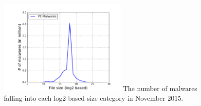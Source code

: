 \begin{figure}[t!]
\begin{center}
\includegraphics[width=2.5in]{figure/size}
{The number of malwares falling into each log2-based size category in November 2015.}
\end{center}
\end{figure}